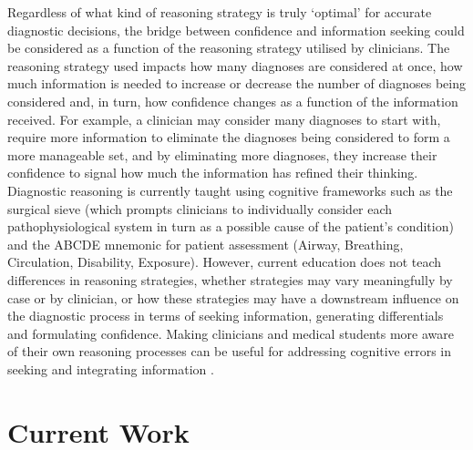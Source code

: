 \documentclass[a4paper, nobind]{templates/ociamthesis}
\begin{document}
Regardless of what kind of reasoning strategy is truly `optimal' for accurate diagnostic decisions, the bridge between confidence and information seeking could be considered as a function of the reasoning strategy utilised by clinicians. The reasoning strategy used impacts how many diagnoses are considered at once, how much information is needed to increase or decrease the number of diagnoses being considered and, in turn, how confidence changes as a function of the information received. For example, a clinician may consider many diagnoses to start with, require more information to eliminate the diagnoses being considered to form a more manageable set, and by eliminating more diagnoses, they increase their confidence to signal how much the information has refined their thinking. Diagnostic reasoning is currently taught using cognitive frameworks such as the surgical sieve (which prompts clinicians to individually consider each pathophysiological system in turn as a possible cause of the patient's condition) and the ABCDE mnemonic for patient assessment (Airway, Breathing, Circulation, Disability, Exposure). However, current education does not teach differences in reasoning strategies, whether strategies may vary meaningfully by case or by clinician, or how these strategies may have a downstream influence on the diagnostic process in terms of seeking information, generating differentials and formulating confidence. Making clinicians and medical students more aware of their own reasoning processes can be useful for addressing cognitive errors in seeking and integrating information \autocite{nendaz_diagnostic_2012}.

\section{Current Work}\label{current-work}
\end{document}
